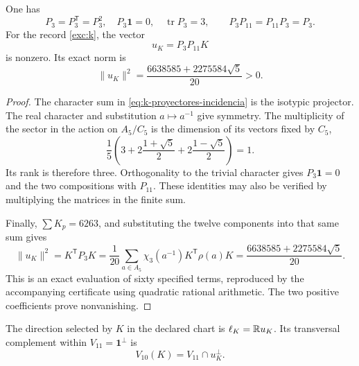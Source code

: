 \begin{lemma}
\label{lem:k-sector-no-nulo}
One has
\[
 P_3=P_3^{\mathsf T}=P_3^2,\quad
 P_3\mathbf1=0,\quad \operatorname{tr}P_3=3,
 \qquad P_3P_{11}=P_{11}P_3=P_3.
\]
For the record \eqref{exc:k}, the vector
\begin{equation}
 u_K=P_3P_{11}K
 \label{eq:k-vector-direccional}
\end{equation}
is nonzero. Its exact norm is
\begin{equation}
 \lVert u_K\rVert^2
 =\frac{6638585+2275584\sqrt5}{20}>0.
 \label{eq:k-norma-direccion}
\end{equation}
\end{lemma}
\begin{proof}
The character sum in \eqref{eq:k-proyectores-incidencia} is the
isotypic projector. The real character and substitution \(a\mapsto a^{-1}\)
give symmetry. The multiplicity of the sector in the action on
\(A_5/C_5\) is the dimension of its vectors fixed by \(C_5\),
\[
 \frac15\left(3+2\frac{1+\sqrt5}{2}
                 +2\frac{1-\sqrt5}{2}\right)=1.
\]
Its rank is therefore three. Orthogonality to the trivial character
gives \(P_3\mathbf1=0\) and the two compositions with \(P_{11}\).
These identities may also be verified by multiplying the
matrices in the finite sum.

Finally, \(\sum K_p=6263\), and substituting the twelve
components into that same sum gives
\[
 \lVert u_K\rVert^2=K^{\mathsf T}P_3K
 =\frac1{20}\sum_{a\in A_5}
                \chi_3(a^{-1})K^{\mathsf T}\rho(a)K
 =\frac{6638585+2275584\sqrt5}{20}.
\]
This is an exact evaluation of sixty specified terms,
reproduced by the accompanying certificate using quadratic rational
arithmetic. The two positive coefficients prove nonvanishing.
\end{proof}

\begin{definition}
The direction selected by \(K\) in the declared chart is
\(\ell_K=\mathbb R u_K\). Its transversal complement within
\(V_{11}=\mathbf1^\perp\) is
\[
 V_{10}(K)=V_{11}\cap u_K^\perp.
\]
\end{definition}

